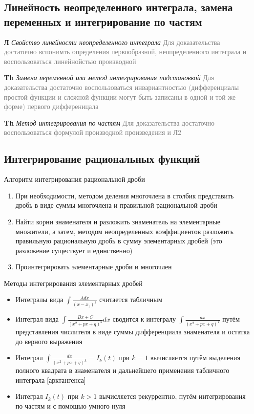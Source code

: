 \subsection{Линейность неопределенного интеграла, замена переменных и интегрирование по частям}

\textbf{Л} \textit{Свойство линейности неопределенного интеграла} \textcolor{gray}{Для доказательства достаточно
вспонимть определения первообразной, неопределенного интеграла и воспользоваться линейнойстью производной}

\textbf{Th} \textit{Замена переменной или метод интегрирования подстановкой} \textcolor{gray}{Для доказательства
достаточно воспользоваться инвариантностью (дифференциалы простой функции и сложной функции могут быть записаны в
одной и той же форме) первого дифференицала}

\textbf{Th} \textit{Метод интегрирования по частям} \textcolor{gray}{Для доказательства достаточно
воспользоваться формулой производной произведения и Л2}

\subsection{Интегрирование рациональных функций}

Алгоритм интегрирования рациональной дроби

\begin{enumerate}
    \item При необходимости, методом деления многочлена в столбик представить дробь в виде суммы многочлена и
    правильной рациональной дроби
    \item Найти корни знаменателя и разложить знаменатель на элементарные множители, а затем, методом неопределенных коэффициентов разложить правильную
    рациональную дробь в сумму элементарных дробей (это разложение существует и единственно)
    \item Проинтегрировать элементарные дроби и многочлен
\end{enumerate}

Методы интегрирования элементарных дробей

\begin{itemize}
    \item Интегралы вида $\int \frac{Adx}{(x-x_1)^k}$ считается табличным
    \item Интеграл вида $\int \frac{Bx + C}{(x^2 + px + q)^k} dx$ сводится к интегралу $\int \frac{dx}{(x^2 + px
    + q)^k}$ путём представления числителя в виде суммы дифференциала знаменателя и остатка до верного выражения
    \item Интеграл $\int \frac{dx}{(x^2 + px + q)^k} = I_k(t)$ при $k = 1$ вычисляется путём выделения полного
    квадрата в знаменателя и дальнейшего применения табличного интеграла [арктангенса]
    \item Интеграл $I_k(t)$ при $k > 1$ вычисляется рекуррентно, путём интегрирования по частям и с помощью
    умного нуля
\end{itemize}

